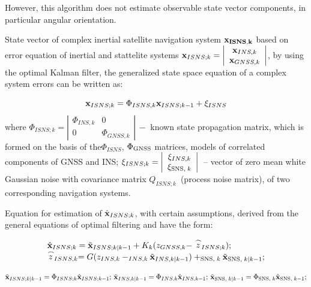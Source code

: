 \documentclass[conference, utf8]{IEEEtran}
\begin{document}
However, this algorithm does not estimate observable state vector components, in particular angular orientation.

State vector of complex inertial satellite navigation system $\bf{x_{ISNS,k}} $ 
based on error equation of inertial and stattelite systems 
${\bf x}_{ISNS;k} =
\left|\begin{array}{c} {{\bf x}_{INS,k} } \\ {{\bf x}_{GNSS,k} } \end{array}\right|$, 
by using the optimal Kalman filter, the generalized state space  equation of a complex system errors can be written as:

\begin{equation}
{\bf x}_{ISNS;k} =\Phi_{ISNS,k} {\bf x}_{ISNS;k-1} +\xi _{ISNS} 
\label{eq:state_prop}
\end{equation}
where  $\Phi_{ISNS;k} =\left|\begin{array}{cc} {\Phi_{INS,k} } & {0} \\ {0} & {\Phi_{GNSS,k} } \end{array}\right|\, -$ known 
state propagation matrix, which is formed on the basis of the$\Phi_{ISNS} $, $\Phi_{{\rm GNSS}} $ matrices, models 
of correlated components of GNSS and INS; 
$\xi _{ISNS;k} =\left|\begin{array}{c} {\xi _{INS,k} } \\ {\xi _{{\rm SNS,\; }k} } \end{array}\right|\,$  -- vector 
of zero mean white Gaussian noise with covariance matrix $Q_{ISNS;k} \, $ (process noise matrix), of two corresponding navigation systems. 

Equation for estimation of $\hat{{\bf x}}_{ISNS;k} $, with certain assumptions, derived 
from the general equations of optimal filtering and have the form:



\begin{equation} 
\label{GrindEQ__1_} 
\begin{array}{l} {\hat{{\bf x}}_{ISNS;k} =\tilde{{\bf x}}_{ISNS;k|k-1} +K_{k} (z_{GNSS,k} -\stackrel{\frown}{z}_{ISNS;k} );} \\ 
{\stackrel{\frown}{z}_{ISNS,k} =G(z_{INS,k} -_{INS,k} \tilde{{\bf x}}_{INS,k|k-1} )+_{{\rm SNS,\; }k} \tilde{{\bf x}}_{{\rm SNS,\; }k|k-1} ;} 
\end{array} \end{equation} 

\begin{equation} \label{GrindEQ__2_} \tilde{{\bf x}}_{ISNS;k|k-1} =\Phi_{ISNS;k} 
\hat{{\bf x}}_{ISNS;k-1} ;\, \tilde{{\bf x}}_{INS,k|k-1} =\Phi_{INS,k} \hat{{\bf x}}_{INS,k-1} ;\, \tilde{{\bf x}}_{{\rm SNS,\; }k|k-1} 
=\Phi_{{\rm SNS,\; }k} \hat{{\bf x}}_{{\rm SNS,\; }k-1} ; 
\end{equation} 
\end{document}
